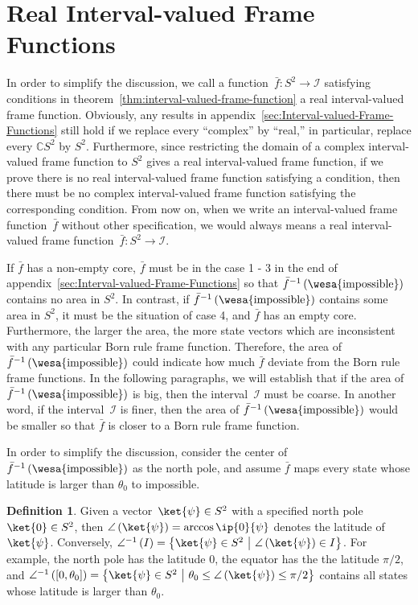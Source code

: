 \documentclass[12pt]{iopart}
\theoremstyle{plain}
\theoremstyle{definition}
\newtheorem{definition}[thm]{Definition}
\theoremstyle{remark}
\newcommand{\imposs}{{\mbox{\wesa{impossible}}}}
\newcommand{\set}[2]{\ensuremath{\left\{ {#1}~\middle|~{#2}\right\} }}
\begin{document}
\section{Real Interval-valued Frame Functions\label{sec:Real-Interval-valued-Frame}}

In order to simplify the discussion, we call a function~$\bar{f}:S^{2}\rightarrow\mathscr{I}$
satisfying conditions in theorem~\ref{thm:interval-valued-frame-function}
a real interval-valued frame function. Obviously, any results in appendix~\ref{sec:Interval-valued-Frame-Functions}
still hold if we replace every ``complex'' by ``real,'' in particular,
replace every $\mathbb{C}S^{2}$ by $S^{2}$. Furthermore, since restricting
the domain of a complex interval-valued frame function to $S^{2}$
gives a real interval-valued frame function, if we prove there is
no real interval-valued frame function satisfying a condition, then
there must be no complex interval-valued frame function satisfying
the corresponding condition. From now on, when we write an interval-valued
frame function~$\bar{f}$ without other specification, we would always
means a real interval-valued frame function~$\bar{f}:S^{2}\rightarrow\mathscr{I}$.

If $\bar{f}$ has a non-empty core, $\bar{f}$ must be in the case
1 - 3 in the end of appendix~\ref{sec:Interval-valued-Frame-Functions}
so that $\bar{f}^{-1}\left(\imposs\right)$ contains no area in $S^{2}$.
In contrast, if $\bar{f}^{-1}\left(\imposs\right)$ contains some
area in $S^{2}$, it must be the situation of case 4, and $\bar{f}$
has an empty core. Furthermore, the larger the area, the more state
vectors which are inconsistent with any particular Born rule frame
function. Therefore, the area of $\bar{f}^{-1}\left(\imposs\right)$
could indicate how much $\bar{f}$ deviate from the Born rule frame
functions. In the following paragraphs, we will establish that if
the area of $\bar{f}^{-1}\left(\imposs\right)$ is big, then the interval~$\mathscr{I}$
must be coarse. In another word, if the interval~$\mathscr{I}$ is
finer, then the area of $\bar{f}^{-1}\left(\imposs\right)$ would
be smaller so that $\bar{f}$ is closer to a Born rule frame function.

In order to simplify the discussion, consider the center of $\bar{f}^{-1}\left(\imposs\right)$
as the north pole, and assume $\bar{f}$ maps every state whose latitude
is larger than $\theta_{0}$ to impossible.

\begin{definition}Given a vector~$\ket{\psi}\in S^{2}$ with a specified
north pole~$\ket{0}\in S^{2}$, then $\angle\left(\ket{\psi}\right)=\arccos\ip{0}{\psi}$
denotes the latitude of $\ket{\psi}$. Conversely, $\angle^{-1}\left(I\right)=\set{\ket{\psi}\in S^{2}}{\angle\left(\ket{\psi}\right)\in I}$.
For example, the north pole has the latitude $0$, the equator has
the the latitude $\pi / 2$, and $\angle^{-1}\left(\left[0,\theta_{0}\right]\right)=\set{\ket{\psi}\in S^{2}}{\theta_{0}\le\angle\left(\ket{\psi}\right)\le\pi / 2}$
contains all states whose latitude is larger than $\theta_{0}$.\end{definition}
\end{document}
